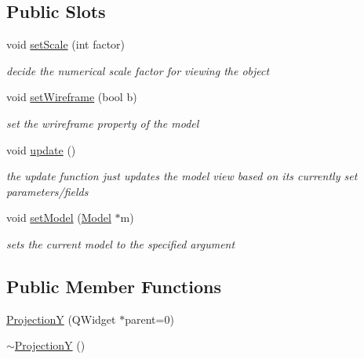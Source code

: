 \subsection*{Public Slots}
\begin{DoxyCompactItemize}
\item 
void \mbox{\hyperlink{class_projection_y_a19960a2d4075443ab87fd50147fee276}{set\+Scale}} (int factor)
\begin{DoxyCompactList}\small\item\em decide the numerical scale factor for viewing the object \end{DoxyCompactList}\item 
void \mbox{\hyperlink{class_projection_y_ab59d0f6245e889c25faf1d0592145d6c}{set\+Wireframe}} (bool b)
\begin{DoxyCompactList}\small\item\em set the wrireframe property of the model \end{DoxyCompactList}\item 
void \mbox{\hyperlink{class_projection_y_a3c709da38e36be432cdc3979cf37d527}{update}} ()
\begin{DoxyCompactList}\small\item\em the update function just updates the model view based on its currently set parameters/fields \end{DoxyCompactList}\item 
void \mbox{\hyperlink{class_projection_y_a66e7b460c9bb0c02b649a241d3b9a647}{set\+Model}} (\mbox{\hyperlink{class_model}{Model}} $\ast$m)
\begin{DoxyCompactList}\small\item\em sets the current model to the specified argument \end{DoxyCompactList}\end{DoxyCompactItemize}
\subsection*{Public Member Functions}
\begin{DoxyCompactItemize}
\item 
\mbox{\hyperlink{class_projection_y_ada83942857907322b5bad855f34ee893}{ProjectionY}} (Q\+Widget $\ast$parent=0)
\item 
\mbox{\hyperlink{class_projection_y_ae04caa820022f1802188835dbc69cf32}{$\sim$\+ProjectionY}} ()
\end{DoxyCompactItemize}
